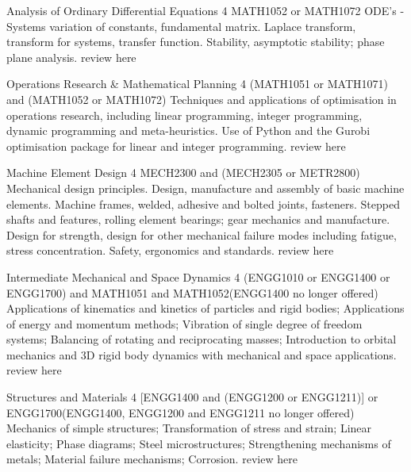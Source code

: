 {
	{Analysis of Ordinary Differential Equations}
	{4}
	{MATH1052 or MATH1072}
	{}
	{}
	{ODE's - Systems variation of constants, fundamental matrix. Laplace transform, transform for systems, transfer function. Stability, asymptotic stability; phase plane analysis.}
	{review here}

	{Operations Research & Mathematical Planning}
	{4}
	{(MATH1051 or MATH1071) and (MATH1052 or MATH1072)}
	{}
	{}
	{Techniques and applications of optimisation in operations research, including linear programming, integer programming, dynamic programming and meta-heuristics. Use of Python and the Gurobi optimisation package for linear and integer programming.}
	{review here}

	{Machine Element Design}
	{4}
	{MECH2300 and (MECH2305 or METR2800)}
	{}
	{}
	{Mechanical design principles. Design, manufacture and assembly of basic machine elements. Machine frames, welded, adhesive and bolted joints, fasteners. Stepped shafts and features, rolling element bearings; gear mechanics and manufacture. Design for strength, design for other mechanical failure modes including fatigue, stress concentration. Safety, ergonomics and standards.}
	{review here}

	{Intermediate Mechanical and Space Dynamics}
	{4}
	{(ENGG1010 or ENGG1400 or ENGG1700) and MATH1051 and MATH1052(ENGG1400 no longer offered)}
	{}
	{}
	{Applications of kinematics and kinetics of particles and rigid bodies; Applications of energy and momentum methods; Vibration of single degree of freedom systems; Balancing of rotating and reciprocating masses; Introduction to orbital mechanics and 3D rigid body dynamics with mechanical and space applications.}
	{review here}

	{Structures and Materials}
	{4}
	{[ENGG1400 and (ENGG1200 or ENGG1211)] or ENGG1700(ENGG1400, ENGG1200 and ENGG1211 no longer offered)}
	{}
	{}
	{Mechanics of simple structures; Transformation of stress and strain; Linear elasticity; Phase diagrams; Steel microstructures; Strengthening mechanisms of metals; Material failure mechanisms; Corrosion.}
	{review here}

}
